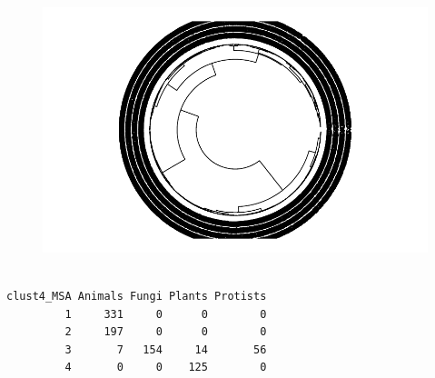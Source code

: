 \documentclass[
  letterpaper,
  DIV=11,
  numbers=noendperiod]{scrreprt}
\newenvironment{Shaded}{}{}
\newcommand{\DecValTok}[1]{\textcolor[rgb]{0.82,0.60,0.40}{#1}}
\newcommand{\FunctionTok}[1]{\textcolor[rgb]{0.38,0.69,0.94}{#1}}
\newcommand{\NormalTok}[1]{\textcolor[rgb]{0.67,0.70,0.75}{#1}}
\newcommand{\OtherTok}[1]{\textcolor[rgb]{0.15,0.68,0.38}{#1}}
\newcommand{\SpecialCharTok}[1]{\textcolor[rgb]{0.34,0.71,0.76}{#1}}
\begin{document}
\begin{figure}[H]

{\centering \includegraphics[width=1\textwidth,height=\textheight]{index_files/figure-pdf/unnamed-chunk-33-1.pdf}

}

\end{figure}

\begin{Shaded}
\end{Shaded}

\begin{verbatim}
          
clust4_MSA Animals Fungi Plants Protists
         1     331     0      0        0
         2     197     0      0        0
         3       7   154     14       56
         4       0     0    125        0
\end{verbatim}

\begin{Shaded}
\end{Shaded}
\end{document}
